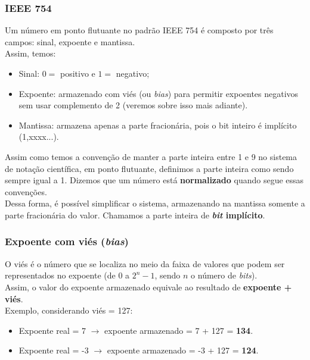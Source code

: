 \documentclass[12pt]{article}
\begin{document}
\subsubsection{IEEE 754}
Um número em ponto flutuante no padrão IEEE 754 é composto por três campos: sinal, expoente e mantissa. 
\vspace{0.2cm} \\
Assim, temos: 

\begin{itemize}
    \item Sinal: $0 =$ positivo e $1 =$ negativo;
    \item Expoente: armazenado com viés (ou \textit{bias}) para permitir expoentes negativos sem usar complemento de 2 (veremos sobre isso mais adiante).
    \item Mantissa: armazena apenas a parte fracionária, pois o bit inteiro é implícito (1,xxxx...).
\end{itemize}

\begin{tcolorbox}[mynote]
Assim como temos a convenção de manter a parte inteira entre 1 e 9 no sistema de notação científica, em ponto flutuante, definimos a parte inteira como sendo sempre igual a 1. Dizemos que um número está \textbf{normalizado} quando segue essas convenções. \\
Dessa forma, é possível simplificar o sistema, armazenando na mantissa somente a parte fracionária do valor. Chamamos a parte inteira de \textbf{\textit{bit} implícito}.
\end{tcolorbox}

\subsubsection{Expoente com viés (\textit{bias})}
O viés é o número que se localiza no meio da faixa de valores que podem ser representados no expoente (de 0 a $2^{n}-1$, sendo $n$ o número de \textit{bits}). 
\vspace{0.2cm} \\
Assim, o valor do expoente armazenado equivale ao resultado de \textbf{expoente + viés}.
\vspace{0.2cm} \\
Exemplo, considerando viés = 127:

\begin{itemize}
    \item Expoente real = 7 $\rightarrow{}$ expoente armazenado = 7 + 127 = \textbf{134}.
    \item Expoente real = -3 $\rightarrow{}$ expoente armazenado = -3 + 127 = \textbf{124}.
\end{itemize}
\end{document}
